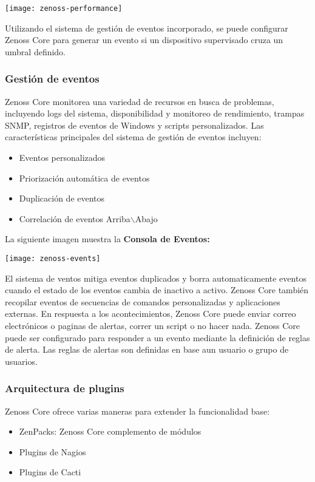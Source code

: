 \centerline{\texttt{[image: zenoss-performance]}}

Utilizando el sistema de gestión de eventos incorporado, se puede
configurar Zenoss Core para generar un evento si un dispositivo
supervisado cruza un umbral definido.

\subsubsection{Gestión de eventos}

Zenoss Core monitorea una variedad de recursos en busca de problemas,
incluyendo logs del sistema, disponibilidad y monitoreo de
rendimiento, trampas SNMP, registros de eventos de Windows y scripts
personalizados. Las características principales del sistema de
gestión de eventos incluyen:

\begin{itemize}
\item Eventos personalizados
\item Priorización automática de eventos
\item Duplicación de eventos
\item Correlación de eventos Arriba$\backslash$Abajo
\end{itemize}

La siguiente imagen muestra la \textbf{Consola de
  Eventos:} \\

\centerline{\texttt{[image: zenoss-events]}}

El sistema de ventos mitiga eventos duplicados y borra automaticamente
eventos cuando el estado de los eventos cambia de inactivo a
activo. Zenoss Core también recopilar eventos de secuencias de
comandos personalizadas y aplicaciones externas.
En respuesta a los acontecimientos, Zenoss Core puede enviar correo
electrónicos o paginas de alertas, correr un script o no hacer
nada. Zenoss Core puede ser configurado para responder a un evento
mediante la definición de reglas de alerta. Las reglas de alertas
son definidas en base aun usuario o grupo de usuarios.

\pagebreak

\subsubsection{Arquitectura de plugins}

Zenoss Core ofrece varias maneras para extender la funcionalidad base:

\begin{itemize}
\item ZenPacks: Zenoss Core complemento de módulos
\item Plugins de Nagios
\item Plugins de Cacti
\end{itemize}

